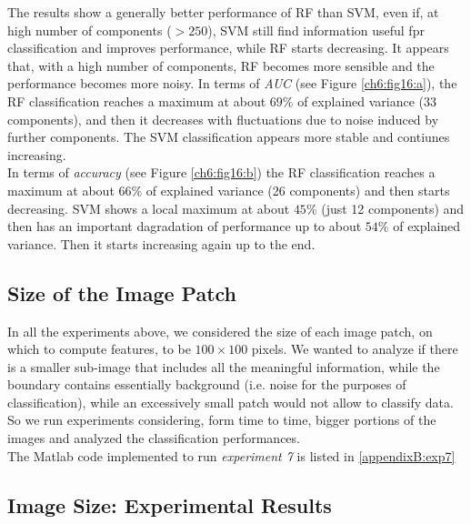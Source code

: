 The results show a generally better performance of \Gls{RF} than \Gls{SVM}, even if, at high number of components ($>250$), \Gls{SVM} still find information useful
fpr classification and improves performance, while \Gls{RF} starts decreasing. It appears that, with a high number of components, \Gls{RF} becomes more sensible
and the performance becomes more noisy.
In terms of \textit{AUC} (see Figure \ref{ch6:fig16:a}), the \Gls{RF} classification reaches
a maximum at about $69\%$ of explained variance (33 components), and then it decreases with fluctuations due to noise induced by further components.
The \Gls{SVM} classification appears more stable and contiunes increasing.\\
In terms of \textit{accuracy} (see Figure \ref{ch6:fig16:b}) the \Gls{RF} classification reaches a maximum at about $66\%$ of explained variance (26 components)
and then starts decreasing. \Gls{SVM} shows a local maximum at about $45\%$ (just 12 components) and then has an important dagradation of performance up to 
about $54\%$ of explained variance. Then it starts increasing again up to the end.


\vspace{0.5cm}

\subsection{Size of the Image Patch}

In all the experiments above, we considered the size of each image patch, on which to compute features, to be $100\times100$ pixels.
We wanted to analyze if there is a smaller sub-image that includes all the meaningful information, while the boundary contains essentially background (i.e. noise for the
purposes of classification), while an excessively small patch would not allow to classify data.\\
So we run experiments considering, form time to time, bigger portions of the images and analyzed the classification performances.
\\
The Matlab code implemented to run \textit{experiment 7} is listed in \ref{appendixB:exp7}



\vspace{0.5cm}

\subsection{Image Size: Experimental Results}

